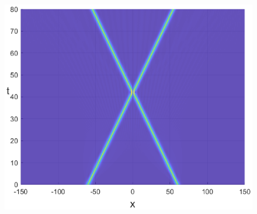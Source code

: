 \documentclass[preprint,12pt]{elsarticle}
\begin{document}
\begin{figure}[H]
\begin{minipage}[h]{0.32\linewidth}
\end{minipage}
\begin{minipage}[h]{0.32\linewidth}
\includegraphics[width=1\linewidth]{fig58.eps}
\end{minipage}


\end{figure}
\end{document}

